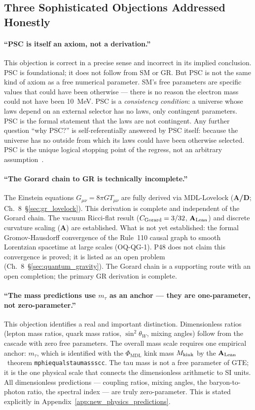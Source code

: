 \documentclass[11pt,openany]{book}
\theoremstyle{remark}
\newcommand{\PHIMDL}{\Phi_{\mathrm{MDL}}}
\newcommand{\lean}[1]{%
  \penalty-100
  \begingroup\def\_{\textunderscore\allowbreak}\texttt{#1}\endgroup}
\newcommand{\sigW}{\sin^2\!\theta_W}
\newcommand{\CatA}{\textbf{A}}
\newcommand{\CatAL}{\ensuremath{\textbf{A}_{\rm Lean}}}
\newcommand{\CatAD}{\textbf{A/D}}
\begin{document}
\subsection*{Three Sophisticated Objections Addressed Honestly}

\paragraph{``PSC is itself an axiom, not a derivation.''}
This objection is correct in a precise sense and incorrect in its implied conclusion.
PSC is foundational; it does not follow from SM or GR.  But PSC is not the same kind of
axiom as a free numerical parameter.  SM's free parameters are specific values that could
have been otherwise — there is no reason the electron mass could not have been 10~MeV.
PSC is a \emph{consistency condition}: a universe whose laws depend on an external
selector has no laws, only contingent parameters.  PSC is the formal statement that the
laws are not contingent.  Any further question ``why PSC?'' is self-referentially answered
by PSC itself: because the universe has no outside from which its laws could have been
otherwise selected.  PSC is the unique logical stopping point of the regress, not an
arbitrary assumption~\cite{SpivackNEMS05}.

\paragraph{``The Gorard chain to GR is technically incomplete.''}
The Einstein equations $G_{\mu\nu} = 8\pi G T_{\mu\nu}$ are fully derived via
MDL-Lovelock (\CatAD; Ch.~8~§\ref{sec:gr_lovelock}).  This derivation is complete and
independent of the Gorard chain.  The vacuum Ricci-flat result ($C_{\rm Gorard} =
3/32$, \CatAL) and discrete curvature scaling (\CatA) are established.  What is not
yet established: the formal Gromov-Hausdorff convergence of the Rule~110 causal graph
to smooth Lorentzian spacetime at large scales (OQ-QG-1).  P48 does not claim this
convergence is proved; it is listed as an open problem (Ch.~8~§\ref{sec:quantum_gravity}).
The Gorard chain is a supporting route with an open completion; the primary GR derivation
is complete.

\paragraph{``The mass predictions use $m_\tau$ as an anchor — they are one-parameter,
not zero-parameter.''}
This objection identifies a real and important distinction.  Dimensionless ratios (lepton
mass ratios, quark mass ratios, $\sigW$, mixing angles) follow from the cascade with zero
free parameters.  The overall mass scale requires one empirical anchor: $m_\tau$, which
is identified with the $\PHIMDL$ kink mass $M_{\rm kink}$ by the \CatAL\ theorem
\lean{mphi\_equals\_tau\_mass\_scc}.  The tau mass is not a free parameter of GTE; it is
the one physical scale that connects the dimensionless arithmetic to SI units.  All
dimensionless predictions — coupling ratios, mixing angles, the baryon-to-photon ratio,
the spectral index — are truly zero-parameter.  This is stated explicitly in Appendix~\ref{app:new_physics_predictions}.
\end{document}
